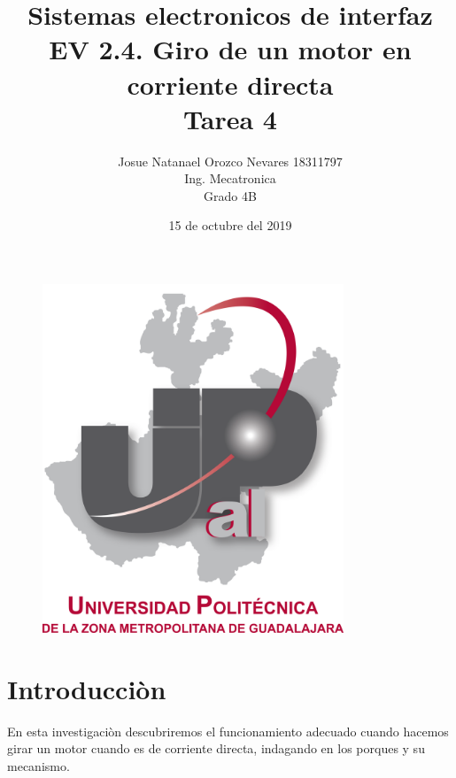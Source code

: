 \documentclass[12pt,a4paper]{article}
\begin{document}
\title{\textbf{Sistemas electronicos de interfaz\\EV 2.4. Giro de un motor en corriente directa\\Tarea 4}}
\author{Josue Natanael Orozco Nevares 18311797\\Ing. Mecatronica\\Grado 4B}
\date{15 de octubre del 2019}
\maketitle
\begin{figure}[h!]
\centering
\includegraphics[width=9cm]{UPCDLZMDG5783-logo.png} 
\end{figure}
\newpage

\section{Introducciòn}
En esta investigaciòn descubriremos el funcionamiento adecuado cuando hacemos girar un motor cuando es de corriente directa, indagando en los porques y su mecanismo.
\end{document}
